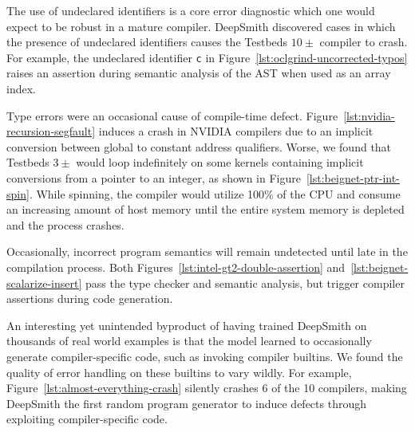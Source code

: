 
The use of undeclared identifiers is a core error diagnostic which one would expect to be robust in a mature compiler. DeepSmith discovered cases in which the presence of undeclared identifiers causes the Testbeds $10\pm$ compiler to crash. For example, the undeclared identifier \texttt{c} in Figure~\ref{lst:oclgrind-uncorrected-typos} raises an assertion during semantic analysis of the AST when used as an array index.

Type errors were an occasional cause of compile-time defect. Figure~\ref{lst:nvidia-recursion-segfault} induces a crash in NVIDIA compilers due to an implicit conversion between global to constant address qualifiers. Worse, we found that Testbeds $3\pm$ would loop indefinitely on some kernels containing implicit conversions from a pointer to an integer, as shown in Figure~\ref{lst:beignet-ptr-int-spin}. While spinning, the compiler would utilize 100\% of the CPU and consume an increasing amount of host memory until the entire system memory is depleted and the process crashes. %

Occasionally, incorrect program semantics will remain undetected until late in the compilation process. Both Figures~\ref{lst:intel-gt2-double-assertion} and~\ref{lst:beignet-scalarize-insert} pass the type checker and semantic analysis, but trigger compiler assertions during code generation.

An interesting yet unintended byproduct of having trained DeepSmith on thousands of real world examples is that the model learned to occasionally generate compiler-specific code, such as invoking compiler builtins. We found the quality of error handling on these builtins to vary wildly. For example, Figure~\ref{lst:almost-everything-crash} silently crashes 6 of the 10 compilers, making DeepSmith the first random program generator to induce defects through exploiting compiler-specific code.


